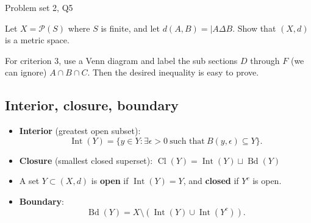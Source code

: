 \begin{problem}{Problem set 2, Q5}{}


    Let $X = \mathcal{P}(S)$ where $S$ is finite, and let $d(A, B) = \lvert A \Delta B$. Show that $(X, d)$ is a metric space.
    
    \tcblower

    For criterion 3, use a Venn diagram and label the sub sections $D$ through $F$ (we can ignore) $A \cap B \cap C$. Then the desired inequality is easy to prove.

\end{problem}

\subsection{Interior, closure, boundary}

\begin{itemize}
    \item \textbf{Interior} (greatest open subset):
        $$ \operatorname{Int}(Y) = \{ y \in Y : \exists \epsilon > 0 
            \ \text{such that} \ B(y, \epsilon) \subseteq Y \} . $$
    \item \textbf{Closure} (smallest closed superset): $\operatorname{Cl}(Y) = \operatorname{Int}(Y) \sqcup \operatorname{Bd}(Y)$
    \item A set $Y \subset (X, d)$ is \textbf{open} if $\operatorname{Int}(Y) = Y$, and \textbf{closed} if $Y^c$ is open.
    \item \textbf{Boundary}:
        $$ \operatorname{Bd}(Y) = X \setminus (\operatorname{Int}(Y)
            \cup \operatorname{Int}(Y^c)) . $$
\end{itemize}

